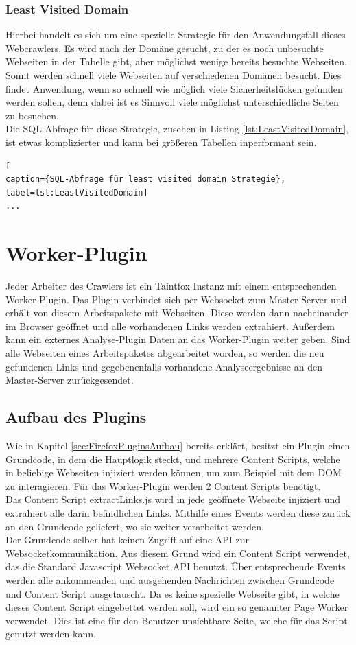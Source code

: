 \subsubsection{Least Visited Domain}
Hierbei handelt es sich um eine spezielle Strategie für den Anwendungsfall dieses Webcrawlers. Es wird nach der Domäne gesucht, zu der es noch unbesuchte Webseiten in der Tabelle gibt, aber möglichst wenige bereits besuchte Webseiten. Somit werden schnell viele Webseiten auf verschiedenen Domänen besucht. Dies findet Anwendung, wenn so schnell wie möglich viele Sicherheitslücken gefunden werden sollen, denn dabei ist es Sinnvoll viele möglichst unterschiedliche Seiten zu besuchen. \\
Die SQL-Abfrage für diese Strategie, zusehen in Listing \ref{lst:LeastVisitedDomain}, ist etwas komplizierter und kann bei größeren Tabellen inperformant sein.

\begin{lstlisting}[
caption={SQL-Abfrage für least visited domain Strategie},
label=lst:LeastVisitedDomain]
...
\end{lstlisting}

\section{Worker-Plugin}
Jeder Arbeiter des Crawlers ist ein Taintfox Instanz mit einem entsprechenden Worker-Plugin. Das Plugin verbindet sich per Websocket zum Master-Server und erhält von diesem Arbeitspakete mit Webseiten. Diese werden dann nacheinander im Browser geöffnet und alle vorhandenen Links werden extrahiert. Außerdem kann ein externes Analyse-Plugin Daten an das Worker-Plugin weiter geben. Sind alle Webseiten eines Arbeitspaketes abgearbeitet worden, so werden die neu gefundenen Links und gegebenenfalls vorhandene Analyseergebnisse an den Master-Server zurückgesendet.
\subsection{Aufbau des Plugins}
Wie in Kapitel \ref{sec:FirefoxPluginsAufbau} bereits erklärt, besitzt ein Plugin einen Grundcode, in dem die Hauptlogik steckt, und mehrere Content Scripts, welche in beliebige Webseiten injiziert werden können, um zum Beispiel mit dem DOM zu interagieren. Für das Worker-Plugin werden 2 Content Scripts benötigt. \\
Das Content Script extractLinks.js wird in jede geöffnete Webseite injiziert und extrahiert alle darin befindlichen Links. Mithilfe eines Events werden diese zurück an den Grundcode geliefert, wo sie weiter verarbeitet werden. \\
Der Grundcode selber hat keinen Zugriff auf eine API zur Websocketkommunikation. Aus diesem Grund wird ein Content Script verwendet, das die Standard Javascript Websocket API benutzt. Über entsprechende Events werden alle ankommenden und ausgehenden Nachrichten zwischen Grundcode und Content Script ausgetauscht. Da es keine spezielle Webseite gibt, in welche dieses Content Script eingebettet werden soll, wird ein so genannter Page Worker verwendet. Dies ist eine für den Benutzer unsichtbare Seite, welche für das Script genutzt werden kann.
